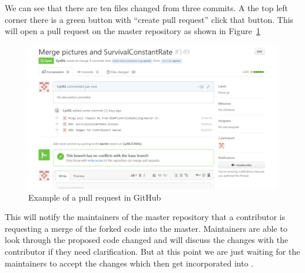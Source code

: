 We can see that there are ten files changed from three commits. A the top left corner there is a green button with \enquote{create pull request} click that button. This will open a pull request on the master repository as shown in Figure~\ref{fig:fork_merge2}

\begin{figure}[H]
	\centering
	\includegraphics[scale=0.6]{Figures/Pull_request1.png}
	\caption{Example of a pull request in GitHub}\label{fig:fork_merge2}
\end{figure}

This will notify the maintainers of the master repository that a contributor is requesting a merge of the forked code into the master. Maintainers are able to look through the proposed code changed and will discuss the changes with the contributor if they need clarification. But at this point we are just waiting for the maintainers to accept the changes which then get incorporated into \CNAME.
